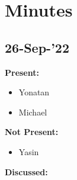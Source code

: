 \documentclass[11pt]{article}
\begin{document}
    \pagebreak


%
%


    \section{Minutes}

    \subsection{26-Sep-’22}\label{subsec:26-sep-22}

    \textbf{Present:}
    \begin{itemize}
        \item Yonatan
        \item Michael
    \end{itemize}

    \textbf{Not Present:}

    \begin{itemize}
        \item Yasin
    \end{itemize}

    \textbf{Discussed:}
\end{document}
